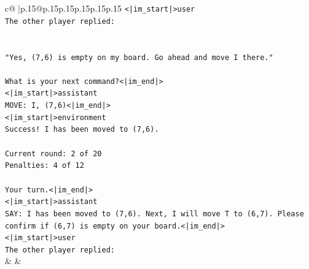 \documentclass{article}
\begin{document}
{\begin{supertabular}{c@{$\;$}|p{.15\linewidth}@{}p{.15\linewidth}p{.15\linewidth}p{.15\linewidth}p{.15\linewidth}p{.15\linewidth}}
{{{\texttt{<|im\_start|>user} \\
\texttt{The other player replied:} \\
\\ 
\\ 
\texttt{"Yes, (7,6) is empty on my board. Go ahead and move I there."} \\
\\ 
\texttt{What is your next command?<|im\_end|>} \\
\texttt{<|im\_start|>assistant} \\
\texttt{MOVE: I, (7,6)<|im\_end|>} \\
\texttt{<|im\_start|>environment} \\
\texttt{Success! I has been moved to (7,6).} \\
\\ 
\texttt{Current round: 2 of 20} \\
\texttt{Penalties: 4 of 12} \\
\\ 
\texttt{Your turn.<|im\_end|>} \\
\texttt{<|im\_start|>assistant} \\
\texttt{SAY: I has been moved to (7,6). Next, I will move T to (6,7). Please confirm if (6,7) is empty on your board.<|im\_end|>} \\
\texttt{<|im\_start|>user} \\
\texttt{The other player replied:} \\
            }
        }
    }
    & & \\ \\


\end{supertabular}}
\end{document}
